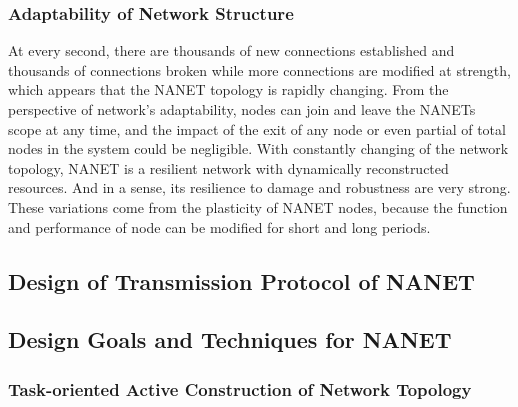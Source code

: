\documentclass[journal,comsoc]{IEEEtran}
\begin{document}
			\subsubsection{Adaptability of Network Structure}
				At every second, there are thousands of new connections established and thousands of connections broken while more connections are modified at strength, which appears that the NANET topology is rapidly changing.
				From the perspective of network's adaptability, nodes can join and leave the NANETs scope at any time, 
				and the impact of the exit of any node or even partial of total nodes in the system could be negligible.
				With constantly changing of the network topology,  NANET is a resilient network with dynamically reconstructed resources.
				And in a sense, its resilience to damage and robustness are very strong.
				These variations come from the plasticity of NANET nodes, because the function and performance of node can be modified for short and long periods.
		
		\subsection{Design of Transmission Protocol of NANET}
		
		
		\subsection{Design Goals and Techniques for NANET}
		\label{section: framework}	
			
			\subsubsection{Task-oriented Active Construction of Network Topology}
			
\end{document}
